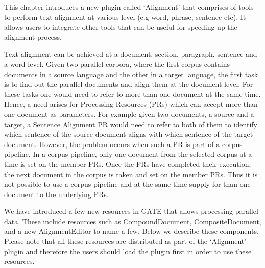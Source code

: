 



This chapter introduces a new plugin called `Alignment' that comprises of tools 
to perform text alignment at various level (e.g word, phrase, sentence etc). It 
allows users to integrate other tools that can be useful for speeding up the 
alignment process. 

Text alignment can be achieved at a document, section, paragraph, sentence and a
word level.  Given two parallel corpora, where the first corpus contains
documents in a source language and the other in a target language, the first
task is to find out the parallel documents and align them at the document level.
For these tasks one would need to refer to more than one document at the same
time.  Hence, a need arises for Processing Resources (PRs) which can accept more
than one document as parameters. For example given two documents, a source and a
target, a Sentence Alignment PR would need to refer to both of them to identify
which sentence of the source document aligns with which sentence of the target
document.  However, the problem occurs when such a PR is part of a corpus 
pipeline.  In a corpus pipeline, only one document from the selected corpus at 
a time is set on the member PRs. Once the PRs have completed their execution,
the next document in the corpus is taken and set on the member PRs. Thus it is
not possible to use a corpus pipeline and at the same time supply for than
one document to the underlying PRs. 


We have introduced a few new resources in GATE that allows processing parallel
data. These include resources such as CompoundDocument, CompositeDocument, and 
a new AlignmentEditor to name a few. Below we describe these components. Please 
note that all these resources are distributed as part of the `Alignment' plugin 
and therefore the users should load the plugin first in order to use these 
resources.

